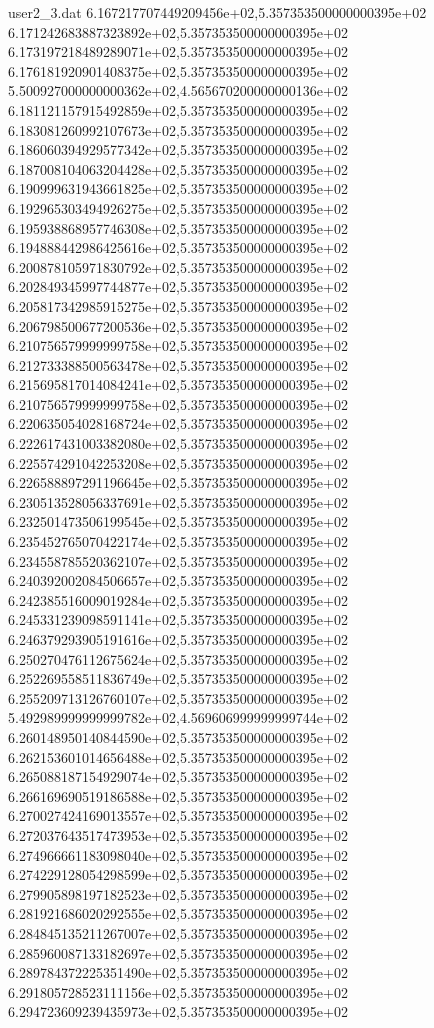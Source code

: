 \begin{filecontents}{user2_3.dat}
6.167217707449209456e+02,5.357353500000000395e+02
6.171242683887323892e+02,5.357353500000000395e+02
6.173197218489289071e+02,5.357353500000000395e+02
6.176181920901408375e+02,5.357353500000000395e+02
5.500927000000000362e+02,4.565670200000000136e+02
6.181121157915492859e+02,5.357353500000000395e+02
6.183081260992107673e+02,5.357353500000000395e+02
6.186060394929577342e+02,5.357353500000000395e+02
6.187008104063204428e+02,5.357353500000000395e+02
6.190999631943661825e+02,5.357353500000000395e+02
6.192965303494926275e+02,5.357353500000000395e+02
6.195938868957746308e+02,5.357353500000000395e+02
6.194888442986425616e+02,5.357353500000000395e+02
6.200878105971830792e+02,5.357353500000000395e+02
6.202849345997744877e+02,5.357353500000000395e+02
6.205817342985915275e+02,5.357353500000000395e+02
6.206798500677200536e+02,5.357353500000000395e+02
6.210756579999999758e+02,5.357353500000000395e+02
6.212733388500563478e+02,5.357353500000000395e+02
6.215695817014084241e+02,5.357353500000000395e+02
6.210756579999999758e+02,5.357353500000000395e+02
6.220635054028168724e+02,5.357353500000000395e+02
6.222617431003382080e+02,5.357353500000000395e+02
6.225574291042253208e+02,5.357353500000000395e+02
6.226588897291196645e+02,5.357353500000000395e+02
6.230513528056337691e+02,5.357353500000000395e+02
6.232501473506199545e+02,5.357353500000000395e+02
6.235452765070422174e+02,5.357353500000000395e+02
6.234558785520362107e+02,5.357353500000000395e+02
6.240392002084506657e+02,5.357353500000000395e+02
6.242385516009019284e+02,5.357353500000000395e+02
6.245331239098591141e+02,5.357353500000000395e+02
6.246379293905191616e+02,5.357353500000000395e+02
6.250270476112675624e+02,5.357353500000000395e+02
6.252269558511836749e+02,5.357353500000000395e+02
6.255209713126760107e+02,5.357353500000000395e+02
5.492989999999999782e+02,4.569606999999999744e+02
6.260148950140844590e+02,5.357353500000000395e+02
6.262153601014656488e+02,5.357353500000000395e+02
6.265088187154929074e+02,5.357353500000000395e+02
6.266169690519186588e+02,5.357353500000000395e+02
6.270027424169013557e+02,5.357353500000000395e+02
6.272037643517473953e+02,5.357353500000000395e+02
6.274966661183098040e+02,5.357353500000000395e+02
6.274229128054298599e+02,5.357353500000000395e+02
6.279905898197182523e+02,5.357353500000000395e+02
6.281921686020292555e+02,5.357353500000000395e+02
6.284845135211267007e+02,5.357353500000000395e+02
6.285960087133182697e+02,5.357353500000000395e+02
6.289784372225351490e+02,5.357353500000000395e+02
6.291805728523111156e+02,5.357353500000000395e+02
6.294723609239435973e+02,5.357353500000000395e+02

\end{filecontents}
